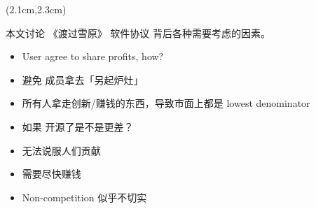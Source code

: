 \begin{preview}


\date{\vspace{-2cm}} %

\maketitle

\setcounter{section}{-1}

\begin{textblock*}{5cm}(2.1cm,2.3cm) %
{}
\end{textblock*}

\begin{minipage}{\textwidth}
\setlength{\parskip}{0.4\baselineskip}

本文讨论 《渡过雪原》 软件协议 背后各种需要考虑的因素。

\begin{itemize}
	\item User agree to share profits, how?
	\item 避免 成员拿去「另起炉灶」 
	\item 所有人拿走创新/赚钱的东西，导致市面上都是 lowest denominator
	\item 如果 开源了是不是更差？
	\item 无法说服人们贡献
	\item 需要尽快赚钱
	\item Non-competition 似乎不切实
\end{itemize}

\end{minipage}
\end{preview}

